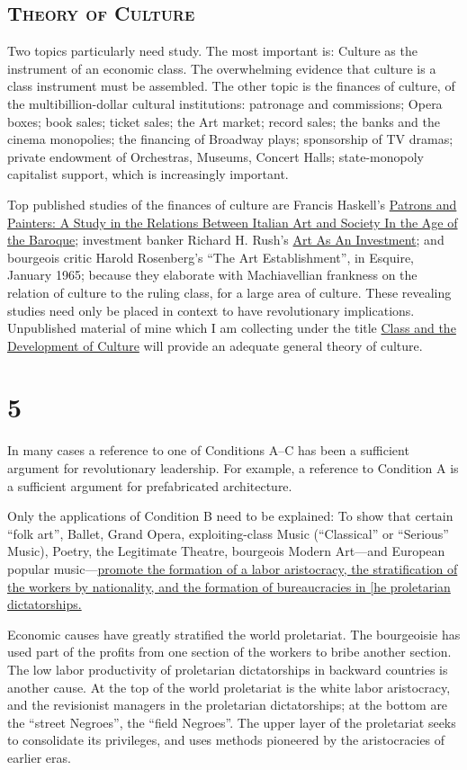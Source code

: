 \subsection*{\textsc{Theory of Culture}}
Two topics particularly need study. The most important is: Culture as the instrument of an economic class. The overwhelming evidence that culture is a class instrument must be assembled. The other topic is the finances of culture, of the multibillion-dollar cultural institutions: patronage and commissions; Opera boxes; book sales; ticket sales; the Art market; record sales; the banks and the cinema monopolies; the financing of Broadway plays; sponsorship of TV dramas; private endowment of Orchestras, Museums, Concert Halls; state-monopoly capitalist support, which is increasingly important. 

Top published studies of the finances of culture are Francis Haskell's \uline{Patrons and Painters: A Study in the Relations Between Italian Art and Society In the Age of the Baroque}; investment banker Richard H. Rush's \uline{Art As An Investment}; and bourgeois critic Harold Rosenberg's \enquote{The Art Establishment}, in Esquire, January 1965; because they elaborate with Machiavellian frankness on the relation of culture to the ruling class, for a large area of culture. These revealing studies need only be placed in context to have revolutionary implications. Unpublished material of mine which I am collecting under the title \uline{Class and the Development of Culture} will provide an adequate general theory of culture. 

\section*{5}

In many cases a reference to one of Conditions A--C has been a sufficient argument for revolutionary leadership. For example, a reference to Condition A is a sufficient argument for prefabricated architecture. 

Only the applications of Condition B need to be explained: To show that certain \enquote{folk art}, Ballet, Grand Opera, exploiting-class Music (\enquote{Classical} or \enquote{Serious} Music), Poetry, the Legitimate Theatre, bourgeois Modern Art---and European popular music---\uline{promote the formation of a labor aristocracy, the stratification of the workers by nationality, and the formation of bureaucracies in [he proletarian dictatorships.}

Economic causes have greatly stratified the world proletariat. The bourgeoisie has used part of the profits from one section of the workers to bribe another section. The low labor productivity of proletarian dictatorships in backward countries is another cause. At the top of the world proletariat is the white labor aristocracy, and the revisionist managers in the proletarian dictatorships; at the bottom are the \enquote{street Negroes}, the \enquote{field Negroes}. The upper layer of the proletariat seeks to consolidate its privileges, and uses methods pioneered by the aristocracies of earlier eras. 

